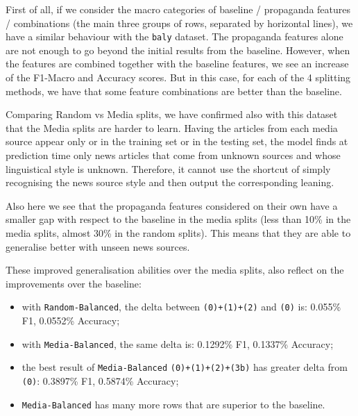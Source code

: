 First of all, if we consider the macro categories of baseline / propaganda features / combinations (the main three groups of rows, separated by horizontal lines), we have a similar behaviour with the \texttt{baly} dataset. The propaganda features alone are not enough to go beyond the initial results from the baseline. However, when the features are combined together with the baseline features, we see an increase of the F1-Macro and Accuracy scores.
But in this case, for each of the 4 splitting methods, we have that some feature combinations are better than the baseline.

Comparing Random vs Media splits, we have confirmed also with this dataset that the Media splits are harder to learn. Having the articles from each media source appear only or in the training set or in the testing set, the model finds at prediction time only news articles that come from unknown sources and whose linguistical style is unknown. Therefore, it cannot use the shortcut of simply recognising the news source style and then output the corresponding leaning.

Also here we see that the propaganda features considered on their own have a smaller gap with respect to the baseline in the media splits (less than 10\% in the media splits, almost 30\% in the random splits).
This means that they are able to generalise better with unseen news sources.

These improved generalisation abilities over the media splits, also reflect on the improvements over the baseline:
\begin{itemize}
    \item with \texttt{Random-Balanced}, the delta between \texttt{(0)+(1)+(2)} and \texttt{(0)} is: 0.055\% F1, 0.0552\% Accuracy;
    \item with \texttt{Media-Balanced}, the same delta is: 0.1292\% F1, 0.1337\% Accuracy;
    \item the best result of \texttt{Media-Balanced} \texttt{(0)+(1)+(2)+(3b)} has greater delta from \texttt{(0)}: 0.3897\% F1, 0.5874\% Accuracy;
    \item \texttt{Media-Balanced} has many more rows that are superior to the baseline.
\end{itemize}

